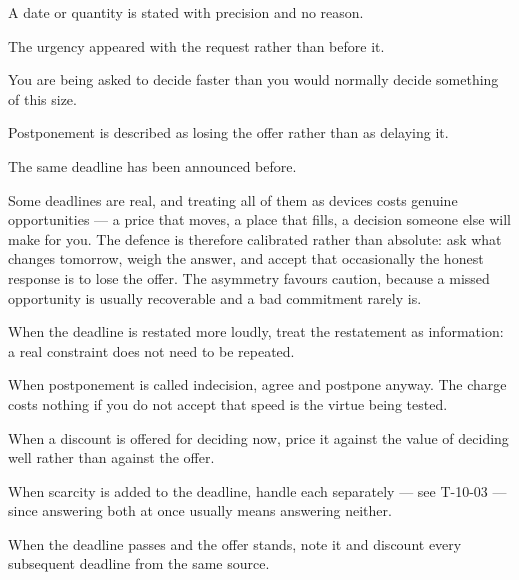 \begin{feedback}
  \item A date or quantity is stated with precision and no reason.
  \item The urgency appeared with the request rather than before it.
  \item You are being asked to decide faster than you would normally decide something of this size.
  \item Postponement is described as losing the offer rather than as delaying it.
  \item The same deadline has been announced before.
\end{feedback}

\begin{failure}
Some deadlines are real, and treating all of them as devices costs genuine opportunities --- a price that moves, a place that fills, a decision someone else will make for you. The defence is therefore calibrated rather than absolute: ask what changes tomorrow, weigh the answer, and accept that occasionally the honest response is to lose the offer. The asymmetry favours caution, because a missed opportunity is usually recoverable and a bad commitment rarely is.
\end{failure}

\begin{countermeasures}
  \item When the deadline is restated more loudly, treat the restatement as information: a real constraint does not need to be repeated.
  \item When postponement is called indecision, agree and postpone anyway. The charge costs nothing if you do not accept that speed is the virtue being tested.
  \item When a discount is offered for deciding now, price it against the value of deciding well rather than against the offer.
  \item When scarcity is added to the deadline, handle each separately --- see T-10-03 --- since answering both at once usually means answering neither.
  \item When the deadline passes and the offer stands, note it and discount every subsequent deadline from the same source.
\end{countermeasures}

\seesources
{}
